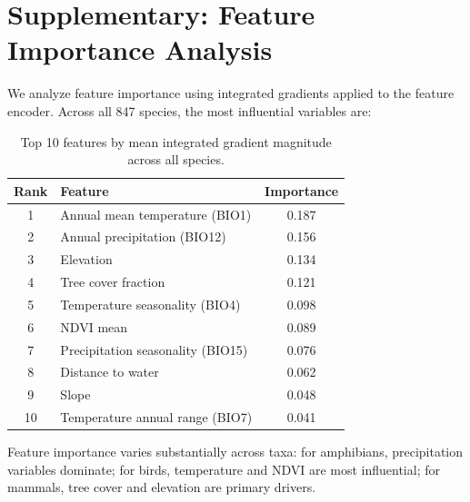 \section{Supplementary: Feature Importance Analysis}

\label{app:features}

We analyze feature importance using integrated gradients
\citep{chen2020deep} applied to the feature encoder. Across all 847
species, the most influential variables are:

\begin{table}[H]
\centering
\caption{Top 10 features by mean integrated gradient magnitude across all
species.}
\label{tab:features}
\begin{tabular}{clc}
\toprule
\textbf{Rank} & \textbf{Feature} & \textbf{Importance} \\
\midrule
1  & Annual mean temperature (BIO1)      & 0.187 \\
2  & Annual precipitation (BIO12)        & 0.156 \\
3  & Elevation                           & 0.134 \\
4  & Tree cover fraction                 & 0.121 \\
5  & Temperature seasonality (BIO4)      & 0.098 \\
6  & NDVI mean                           & 0.089 \\
7  & Precipitation seasonality (BIO15)   & 0.076 \\
8  & Distance to water                   & 0.062 \\
9  & Slope                               & 0.048 \\
10 & Temperature annual range (BIO7)     & 0.041 \\
\bottomrule
\end{tabular}
\end{table}

Feature importance varies substantially across taxa: for amphibians,
precipitation variables dominate; for birds, temperature and NDVI are
most influential; for mammals, tree cover and elevation are primary
drivers.

